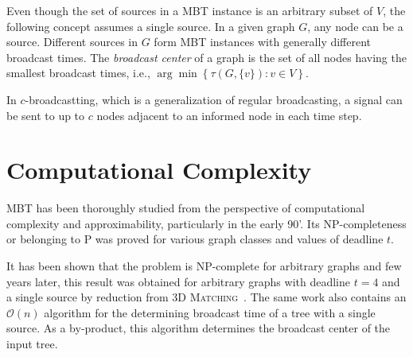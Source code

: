 Even though the set of sources in a MBT instance is an arbitrary subset of $V$, the following concept assumes a single source.
In a given graph $G$, any node can be a source.
Different sources in $G$ form MBT instances with generally different broadcast times.
The \emph{broadcast center} of a graph is the set of all nodes having the smallest broadcast times, i.e., $\arg\min\left\{\tau(G,\{v\}):v\in V\right\}$.

In $c$-broadcastting, which is a generalization of regular broadcasting, a signal can be sent to up to $c$ nodes adjacent to an informed node in each time step.


\section{Computational Complexity}

MBT has been thoroughly studied from the perspective of computational complexity and approximability, particularly in the early 90'.
Its NP-completeness or belonging to P was proved for various graph classes and values of deadline $t$.

It has been shown that the problem is NP-complete for arbitrary graphs \cite{garey79} and few years later, 
this result was obtained for arbitrary graphs with deadline $t=4$ and a single source by reduction from \textsc{3D Matching}~\cite{slater81}. 
The same work also contains an $\mathcal{O}(n)$ algorithm for the determining broadcast time of a tree with a single source. 
As a by-product, this algorithm determines the broadcast center of the input tree.

